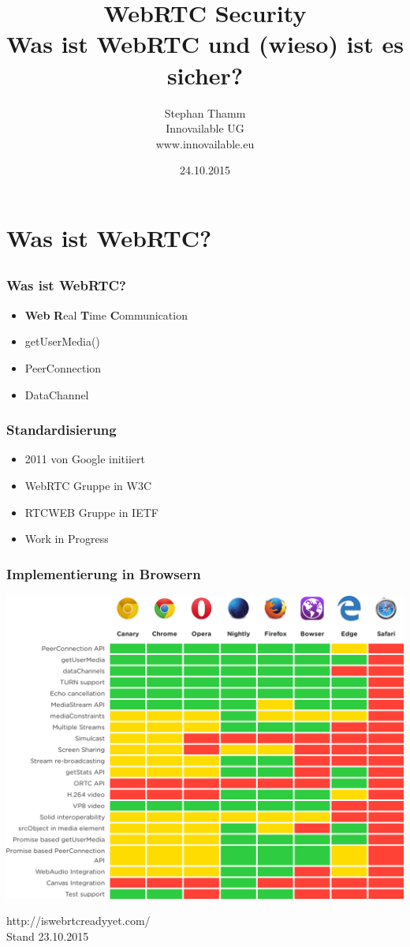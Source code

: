 \documentclass[12pt]{beamer}
\title{\huge WebRTC Security \\ \small Was ist WebRTC und (wieso) ist es sicher?}
\author{Stephan Thamm \\ Innovailable UG \\ www.innovailable.eu}
\date{24.10.2015}
\begin{document}
\maketitle

\frame{\tableofcontents[sections={1-4}]}


\section{Was ist WebRTC?}
\subsection{} 

\begin{frame}
  \frametitle{Was ist WebRTC?}
  \begin{itemize}
    \item<2-> \textbf{Web} \textbf{R}eal \textbf{T}ime \textbf{C}ommunication
    \item<3-> getUserMedia()
    \item<4-> PeerConnection
    \item<5-> DataChannel
  \end{itemize}
\end{frame}

\begin{frame}
  \frametitle{Standardisierung}
  \begin{itemize}
    \item<2-> 2011 von Google initiiert
    \item<3-> WebRTC Gruppe in W3C
    \item<4-> RTCWEB Gruppe in IETF
    \item<5-> Work in Progress
  \end{itemize}
\end{frame}

\begin{frame}
  \frametitle{Implementierung in Browsern}
  \pause
  \centerline{\includegraphics[height=0.7\textheight]{img/webrtc_ready.png}}
  \hfill \tiny http://iswebrtcreadyyet.com/ \\
  \hfill \tiny Stand 23.10.2015
\end{frame}
\end{document}
